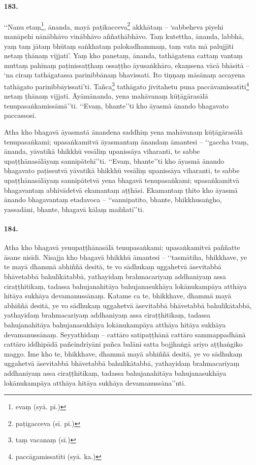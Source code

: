 \paragraph{183.} ‘‘Nanu etaṃ\footnote{evaṃ (syā. pī.)}, ānanda, mayā paṭikacceva\footnote{paṭigacceva (sī. pī.)} akkhātaṃ – ‘sabbeheva piyehi manāpehi nānābhāvo vinābhāvo aññathābhāvo. Taṃ kutettha, ānanda, labbhā, yaṃ taṃ jātaṃ bhūtaṃ saṅkhataṃ palokadhammaṃ, taṃ vata mā palujjīti netaṃ ṭhānaṃ vijjati’. Yaṃ kho panetaṃ, ānanda, tathāgatena cattaṃ vantaṃ muttaṃ pahīnaṃ paṭinissaṭṭhaṃ ossaṭṭho āyusaṅkhāro, ekaṃsena vācā bhāsitā – ‘na ciraṃ tathāgatassa parinibbānaṃ bhavissati. Ito tiṇṇaṃ māsānaṃ accayena tathāgato parinibbāyissatī’ti. Tañca\footnote{taṃ vacanaṃ (sī.)} tathāgato jīvitahetu puna paccāvamissatīti\footnote{paccāgamissatīti (syā. ka.)} netaṃ ṭhānaṃ vijjati. Āyāmānanda, yena mahāvanaṃ kūṭāgārasālā tenupasaṅkamissāmā’’ti. ‘‘Evaṃ, bhante’’ti kho āyasmā ānando bhagavato paccassosi.

Atha kho bhagavā āyasmatā ānandena saddhiṃ yena mahāvanaṃ kūṭāgārasālā tenupasaṅkami; upasaṅkamitvā āyasmantaṃ ānandaṃ āmantesi – ‘‘gaccha tvaṃ, ānanda, yāvatikā bhikkhū vesāliṃ upanissāya viharanti, te sabbe upaṭṭhānasālāyaṃ sannipātehī’’ti. ‘‘Evaṃ, bhante’’ti kho āyasmā ānando bhagavato paṭissutvā yāvatikā bhikkhū vesāliṃ upanissāya viharanti, te sabbe upaṭṭhānasālāyaṃ sannipātetvā yena bhagavā tenupasaṅkami; upasaṅkamitvā bhagavantaṃ abhivādetvā ekamantaṃ aṭṭhāsi. Ekamantaṃ ṭhito kho āyasmā ānando bhagavantaṃ etadavoca – ‘‘sannipatito, bhante, bhikkhusaṅgho, yassadāni, bhante, bhagavā kālaṃ maññatī’’ti.

\paragraph{184.} Atha kho bhagavā yenupaṭṭhānasālā tenupasaṅkami; upasaṅkamitvā paññatte āsane nisīdi. Nisajja kho bhagavā bhikkhū āmantesi – ‘‘tasmātiha, bhikkhave, ye te mayā dhammā abhiññā desitā, te vo sādhukaṃ uggahetvā āsevitabbā bhāvetabbā bahulīkātabbā, yathayidaṃ brahmacariyaṃ addhaniyaṃ assa ciraṭṭhitikaṃ, tadassa bahujanahitāya bahujanasukhāya lokānukampāya atthāya hitāya sukhāya devamanussānaṃ. Katame ca te, bhikkhave, dhammā mayā abhiññā desitā, ye vo sādhukaṃ uggahetvā āsevitabbā bhāvetabbā bahulīkātabbā, yathayidaṃ brahmacariyaṃ addhaniyaṃ assa ciraṭṭhitikaṃ, tadassa bahujanahitāya bahujanasukhāya lokānukampāya atthāya hitāya sukhāya devamanussānaṃ. Seyyathidaṃ – cattāro satipaṭṭhānā cattāro sammappadhānā cattāro iddhipādā pañcindriyāni pañca balāni satta bojjhaṅgā ariyo aṭṭhaṅgiko maggo. Ime kho te, bhikkhave, dhammā mayā abhiññā desitā, ye vo sādhukaṃ uggahetvā āsevitabbā bhāvetabbā bahulīkātabbā, yathayidaṃ brahmacariyaṃ addhaniyaṃ assa ciraṭṭhitikaṃ, tadassa bahujanahitāya bahujanasukhāya lokānukampāya atthāya hitāya sukhāya devamanussāna’’nti.

